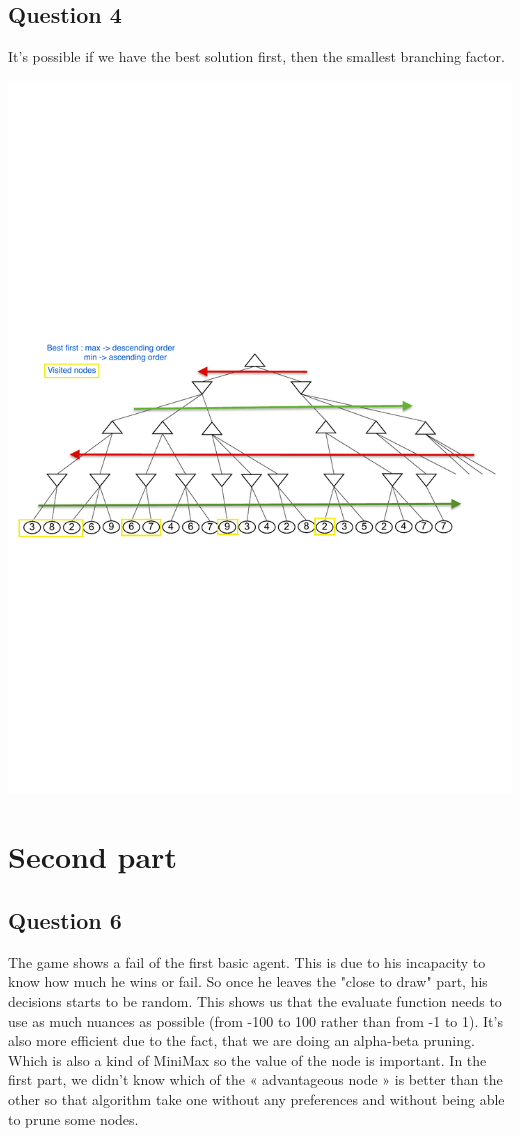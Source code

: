 \documentclass[10pt]{report}
\begin{document}
\subsection*{Question 4}
It's possible if we have the best solution first, then the smallest branching factor.

\begin{center}
\includegraphics[scale=0.6]{Q4.pdf}
\end{center}

\section*{Second part}
\subsection*{Question 6}
The game shows a fail of the first basic agent. This is due to his incapacity to know how much he wins or fail. So once he leaves the "close to draw" part, his decisions starts to be random. This shows us that the evaluate function needs to use as much nuances as possible (from -100 to 100 rather than from -1 to 1). It's also more efficient due to the fact, that we are doing an alpha-beta pruning. Which is also a kind of MiniMax so the value of the node is important. In the first part, we didn't know which of the « advantageous node » is better than the other so that algorithm take one without any preferences and without being able to prune some nodes.
\end{document}
